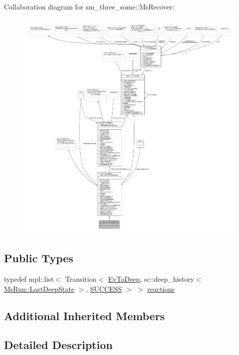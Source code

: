 Collaboration diagram for sm\+\_\+three\+\_\+some\+:\+:Ms\+Recover\+:
\nopagebreak
\begin{figure}[H]
\begin{center}
\leavevmode
\includegraphics[width=350pt]{classsm__three__some_1_1MsRecover__coll__graph}
\end{center}
\end{figure}
\subsection*{Public Types}
\begin{DoxyCompactItemize}
\item 
typedef mpl\+::list$<$ Transition$<$ \hyperlink{structsm__three__some_1_1EvToDeep}{Ev\+To\+Deep}, sc\+::deep\+\_\+history$<$ \hyperlink{classsmacc_1_1SmaccState_a60088405d2d99d468caa0baa3b2830a8}{Ms\+Run\+::\+Last\+Deep\+State} $>$, \hyperlink{classSUCCESS}{S\+U\+C\+C\+E\+SS} $>$ $>$ \hyperlink{classsm__three__some_1_1MsRecover_ab41d65bcc8f575199685a12431962bed}{reactions}
\end{DoxyCompactItemize}
\subsection*{Additional Inherited Members}


\subsection{Detailed Description}


